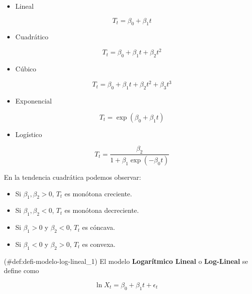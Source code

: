 \documentclass[12pt,]{krantz}
\providecommand{\tightlist}{%
  \setlength{\itemsep}{0pt}\setlength{\parskip}{0pt}}
\theoremstyle{definition}
\theoremstyle{definition}
\theoremstyle{definition}
\theoremstyle{remark}
\let\BeginKnitrBlock\begin \let\EndKnitrBlock\end
\begin{document}
\begin{itemize}
\tightlist
\item
  Lineal

  \begin{equation}
  T_t=\beta_0+\beta_1t
  \label{eq:eq-modelo-lineal}
  \end{equation}
\item
  Cuadrático

  \begin{equation}
  T_t=\beta_0+\beta_1t+\beta_2t^2
  \label{eq:eq-modelo-cuadratico}
  \end{equation}
\item
  Cúbico

  \begin{equation}
  T_t=\beta_0+\beta_1t+\beta_2t^2+\beta_3t^3
  \label{eq:eq-modelo-cubico}
  \end{equation}
\item
  Exponencial

  \begin{equation}
  T_t=\exp(\beta_0+\beta_1t)
  \label{eq:eq-modelo-exponencial}
  \end{equation}
\item
  Logístico

  \begin{equation}
  T_t=\frac{\beta_2}{1+\beta_1\exp(-\beta_0t)}
  \label{eq:eq-modelo-logistico}
  \end{equation}
\end{itemize}

En la tendencia cuadrática podemos observar:

\begin{itemize}
\tightlist
\item
  Si \(\beta_1,\beta_2>0\), \(T_t\) es monótona creciente.
\item
  Si \(\beta_1,\beta_2<0\), \(T_t\) es monótona decreciente.
\item
  Si \(\beta_1>0\) y \(\beta_2<0\), \(T_t\) es cóncava.
\item
  Si \(\beta_1<0\) y \(\beta_2>0\), \(T_t\) es convexa.
\end{itemize}

\BeginKnitrBlock{definition}
\protect\hypertarget{def:defi-modelo-log-lineal_1}{}{(\#def:defi-modelo-log-lineal\_1)
}El modelo \textbf{Logarítmico Lineal} o \textbf{Log-Lineal} se define
como

\begin{equation}
\ln X_t = \beta_0+\beta_1t + \epsilon_t
\label{eq:eq-modelo-log-lineal}
\end{equation}
\EndKnitrBlock{definition}
\end{document}
